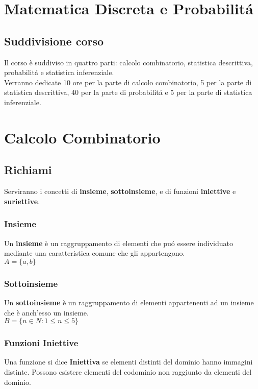 \documentclass[11pt]{article}
\begin{document}
    \section*{\huge \centering Matematica Discreta e Probabilit\'a }
     \subsection*{Suddivisione corso} 
    
        Il corso \`e suddiviso in quattro parti: calcolo combinatorio,
        statistica descrittiva, probabilit\'a e statistica inferenziale. \\
        Verranno dedicate 10 ore per la parte di calcolo combinatorio, 5 
        per la parte di statistica descrittiva, 40 per la parte di probabilit\'a e 5 per la parte di statistica inferenziale.
   
   \section{Calcolo Combinatorio}
    \subsection{Richiami}
        Serviranno i concetti di \textbf{insieme},\textbf{ sottoinsieme}, e di funzioni \textbf{iniettive} e \textbf{suriettive}.
        \subsubsection{Insieme}
            Un \textbf{insieme} \`e un raggruppamento di elementi che pu\'o essere individuato mediante una caratteristica comune che gli appartengono.\\
            $A=\{a,b\}$
        \subsubsection{Sottoinsieme}
            Un \textbf{sottoinsieme} \`e un raggruppamento di elementi appartenenti ad un insieme che \`e anch'esso un insieme.\\
            $B=\{n \in N : 1\leq n \leq 5 \} $ 
        \subsubsection{Funzioni Iniettive}
            Una funzione si dice \textbf{Iniettiva} se elementi distinti del dominio hanno immagini distinte. Possono esistere elementi del codominio non raggiunto da elementi del dominio.
\end{document}
